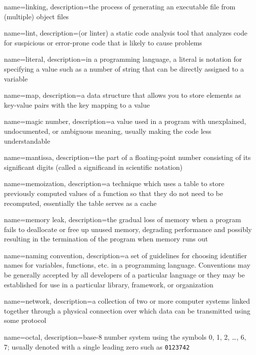 {
  name=linking,
  description={the process of generating an executable file from (multiple) object files}
}

{
  name=lint,
  description={(or linter) a static code analysis tool that analyzes code for suspicious or error-prone code that is likely to cause problems}
}

{
  name=literal,
  description={in a programming language, a literal is notation for specifying a value such as a number of string that can be 
  	directly assigned to a variable}
}

{
  name=map,
  description={a data structure that allows you to store elements as key-value pairs with the key mapping to a value}
}

{
  name=magic number,
  description={a value used in a program with unexplained, undocumented, or ambiguous meaning, usually making the code less understandable}
}

{
  name=mantissa,
  description={the part of a floating-point number consisting of its significant digits (called a significand in scientific notation)}
}

{
  name=memoization,
  description={a technique which uses a table to store previously computed values of a function so that they do not need to be recomputed, essentially the table serves as a cache}
}

{
  name=memory leak,
  description={the gradual loss of memory when a program fails to deallocate or free up unused memory, degrading performance and possibly resulting in the termination of the program when memory runs out}
}

{
  name=naming convention,
  description={a set of guidelines for choosing identifier names for variables, functions, etc. in a programming language.  Conventions may be generally accepted by all developers of a particular language or they may be established for use in a particular library, framework, or organization}
}

{
  name=network,
  description={a collection of two or more computer systems linked together through a physical connection over which data can be transmitted using some protocol}
}

{
  name=octal,
  description={base-8 number system using the symbols 0, 1, 2, \ldots, 6, 7; usually denoted with a single leading zero such as
\texttt{0123742}}
}

